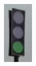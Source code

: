 \begin{figure}[h]
\begin{subfigure}[b]{0.15\linewidth}
    \caption{}
  \end{subfigure}
  \begin{subfigure}[b]{0.15\linewidth}
      \includegraphics[width=\linewidth]{figures/signs/TrafficLightGreen.jpg}

\end{subfigure}
\end{figure}
